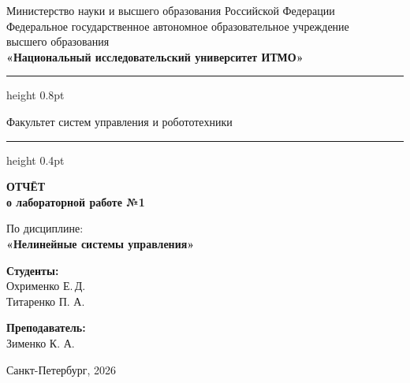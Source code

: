 \documentclass[a4paper,12pt]{article}
\begin{document}
\begin{titlepage}
\centering

\vspace*{0.5cm}
{\small
Министерство науки и высшего образования Российской Федерации\\[2pt]
Федеральное государственное автономное образовательное учреждение\\
высшего образования\\[2pt]
\textbf{«Национальный исследовательский университет ИТМО»}\\
}

\vspace{0.8cm}
\hrule height 0.8pt
\vspace{0.3cm}

{\large Факультет систем управления и робототехники}

\vspace{0.3cm}
\hrule height 0.4pt
\vspace{2.5cm}

{\Huge\bfseries ОТЧЁТ}\\[0.4cm]
{\LARGE\bfseries о лабораторной работе №1}\\[0.8cm]

\begin{tcolorbox}[
colback=gray!4,
colframe=gray!10,
boxrule=0.8pt,
arc=4pt,
left=12pt, right=12pt, top=8pt, bottom=8pt
]
\centering
{\large По дисциплине:\\[4pt]}
{\large\bfseries «Нелинейные системы управления»}\\[10pt]
\end{tcolorbox}

\vspace{5cm}

\begin{minipage}{0.45\textwidth}
\raggedright
{\large\bfseries Студенты:}\\[4pt]
Охрименко Е.\,Д.\\
Титаренко П. А.
\end{minipage}
\hfill
\begin{minipage}{0.45\textwidth}
\raggedleft
{\large\bfseries Преподаватель:}\\[4pt]
Зименко К. А.\\
\end{minipage}

\vfill
\vspace{0.4cm}
{\large Санкт-Петербург, 2026}
\end{titlepage}

\newpage
\tableofcontents
\end{document}
